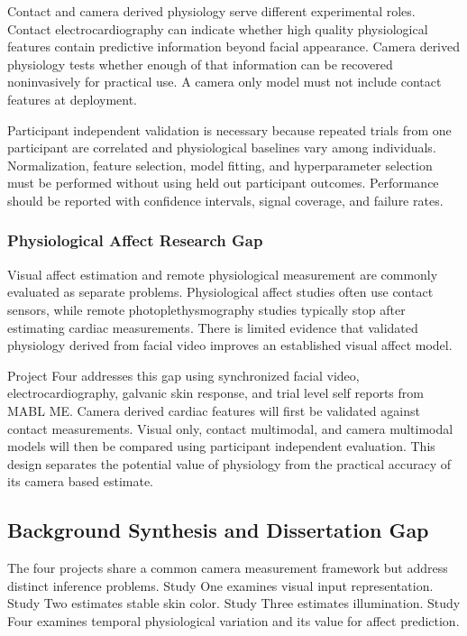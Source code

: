 \documentclass[12pt]{article}
\begin{document}
Contact and camera derived physiology serve different experimental roles. Contact electrocardiography can indicate whether high quality physiological features contain predictive information beyond facial appearance. Camera derived physiology tests whether enough of that information can be recovered noninvasively for practical use. A camera only model must not include contact features at deployment.

Participant independent validation is necessary because repeated trials from one participant are correlated and physiological baselines vary among individuals. Normalization, feature selection, model fitting, and hyperparameter selection must be performed without using held out participant outcomes. Performance should be reported with confidence intervals, signal coverage, and failure rates.

\subsubsection{Physiological Affect Research Gap}

Visual affect estimation and remote physiological measurement are commonly evaluated as separate problems. Physiological affect studies often use contact sensors, while remote photoplethysmography studies typically stop after estimating cardiac measurements. There is limited evidence that validated physiology derived from facial video improves an established visual affect model.

Project Four addresses this gap using synchronized facial video, electrocardiography, galvanic skin response, and trial level self reports from MABL ME. Camera derived cardiac features will first be validated against contact measurements. Visual only, contact multimodal, and camera multimodal models will then be compared using participant independent evaluation. This design separates the potential value of physiology from the practical accuracy of its camera based estimate.

\subsection{Background Synthesis and Dissertation Gap}

The four projects share a common camera measurement framework but address distinct inference problems. Study One examines visual input representation. Study Two estimates stable skin color. Study Three estimates illumination. Study Four examines temporal physiological variation and its value for affect prediction.
\end{document}
